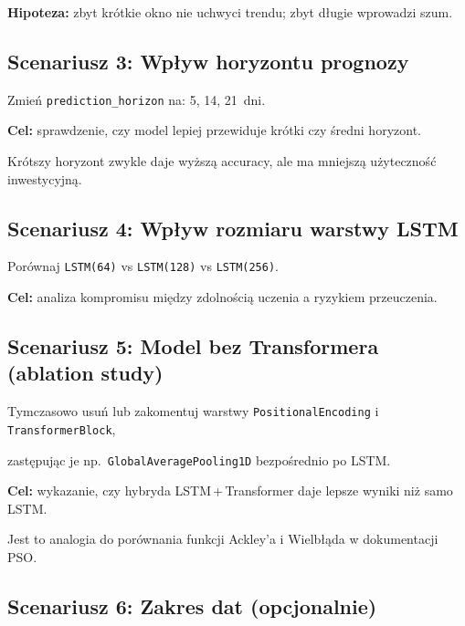 \documentclass[12pt,a4paper]{report}
\begin{document}
\textbf{Hipoteza:} zbyt krótkie okno nie uchwyci trendu; zbyt długie wprowadzi szum.



\subsection{Scenariusz 3: Wpływ horyzontu prognozy}



Zmień \texttt{prediction\_horizon} na: 5, 14, 21~dni.



\textbf{Cel:} sprawdzenie, czy model lepiej przewiduje krótki czy średni horyzont.

Krótszy horyzont zwykle daje wyższą accuracy, ale ma mniejszą użyteczność inwestycyjną.



\subsection{Scenariusz 4: Wpływ rozmiaru warstwy LSTM}



Porównaj \texttt{LSTM(64)} vs \texttt{LSTM(128)} vs \texttt{LSTM(256)}.



\textbf{Cel:} analiza kompromisu między zdolnością uczenia a ryzykiem przeuczenia.



\subsection{Scenariusz 5: Model bez Transformera (ablation study)}



Tymczasowo usuń lub zakomentuj warstwy \texttt{PositionalEncoding} i \texttt{TransformerBlock},

zastępując je np.\ \texttt{GlobalAveragePooling1D} bezpośrednio po LSTM.



\textbf{Cel:} wykazanie, czy hybryda LSTM\,+\,Transformer daje lepsze wyniki niż samo LSTM.

Jest to analogia do porównania funkcji Ackley'a i Wielbłąda w dokumentacji PSO.



\subsection{Scenariusz 6: Zakres dat (opcjonalnie)}
\end{document}
